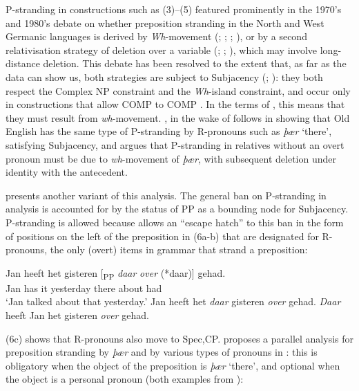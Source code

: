\documentclass[output=paper]{langsci/langscibook}
\begin{document}
P-stranding in constructions such as (3)--(5) featured prominently in the
1970’s and 1980’s debate on whether preposition stranding in the North and West
Germanic languages is derived by \textit{Wh}-movement
(\cite{Chomsky1977,ChomskyLasnik1977}; \cite[286--297]{vanRiemsdijk1978};
\citealt{Vat1978}; \citealt{vanKemenade1987}), or by a second relativisation
strategy of deletion over a variable (\citealt{Maling1976};
\citealt{BresnanGrimshaw1978}; \citealt{Allen1977,Allen1980}), which may
involve long-distance deletion. This debate has been resolved to the extent
that, as far as the data can show us, both strategies are subject to Subjacency
(\citealt{Allen1980}; \citealt{vanKemenade1987}): they both respect the Complex
NP constraint and the \textit{Wh}-island constraint, and occur only in
constructions that allow COMP to COMP . In the terms of
\textcite{Chomsky1977,ChomskyLasnik1977}, this means that they must result from
\textit{wh}-movement. \citet{Vat1978}, in the wake of
\citet{vanRiemsdijk1978} follows \citet{Allen1977} in showing that Old English
has the same type of P-stranding by R-pronouns such
as \textit{þær} ‘there’, satisfying Subjacency, and argues that
P-stranding in relatives without an overt pronoun
must be due to \textit{wh}-movement of \textit{þær}, with subsequent deletion
under identity with the antecedent.

 presents another variant of this analysis. The general
ban on P-stranding in  analysis is accounted for by
the status of PP as a bounding node for Subjacency.  P-stranding is
allowed because  allows an “escape hatch” to this ban in the form of
positions on the left of the preposition in (6a-b) that are designated for
R-pronouns, the only (overt) items in  grammar that strand a preposition:

\ea%
    \label{ex:key:11.6}
    	\ea
	\gll Jan heeft het gisteren [\textsubscript{PP} \textit{daar} \textit{over} (*daar)] gehad.\\
        		Jan has    it   yesterday {}    there  about   {}         had\\
	\glt ‘Jan talked about that yesterday.’
	\ex Jan heeft het \textit{daar} gisteren \textit{over} gehad.
	\ex \textit{Daar} heeft Jan het gisteren \textit{over} gehad.
	\z
\z

(6c) shows that R-pronouns also move to Spec,CP. 
proposes a parallel analysis for preposition stranding by \textit{þær} and by
various types of pronouns in : this is obligatory when the object of
the preposition is \textit{þær} ‘there’, and optional when the object is a
personal pronoun (both examples from
\citealt[117]{vanKemenade1987}):
\end{document}
